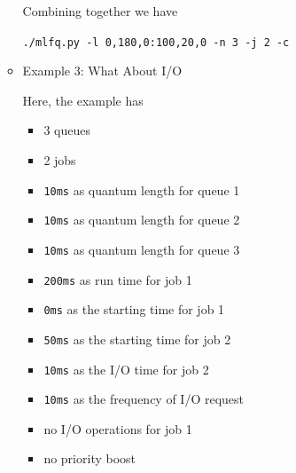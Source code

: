 \documentclass[12pt]{article}
\begin{document}
\begin{enumerate}[1.]
\begin{itemize}
        \bigskip

        Combining together we have

        \texttt{./mlfq.py -l 0,180,0:100,20,0 -n 3 -j 2 -c}

        \item Example 3: What About I/O

        \bigskip

        Here, the example has

        \begin{itemize}
            \item 3 queues
            \item 2 jobs
            \item \texttt{10ms} as quantum length for queue 1
            \item \texttt{10ms} as quantum length for queue 2
            \item \texttt{10ms} as quantum length for queue 3
            \item \texttt{200ms} as run time for job 1
            \item \texttt{0ms} as the starting time for job 1
            \item \texttt{50ms} as the starting time for job 2
            \item \texttt{10ms} as the I/O time for job 2
            \item \texttt{10ms} as the frequency of I/O request
            \item no I/O operations for job 1
            \item no priority boost
        \end{itemize}

        \bigskip


    \end{itemize}


\end{enumerate}
\end{document}
